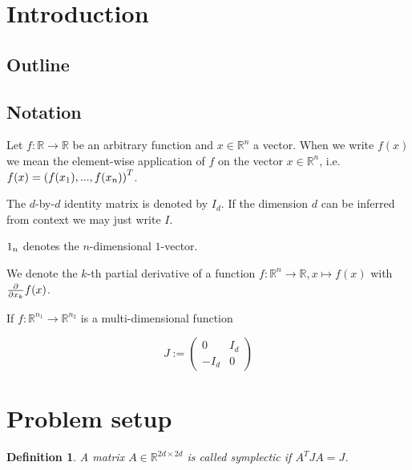 \documentclass[twoside,a4paper]{article}
\newtheorem{definition}{Definition}
\begin{document}
\section{Introduction}

\subsection{Outline}

\subsection{Notation}

Let $f: \mathbb{R} \rightarrow \mathbb{R}$ be an arbitrary function and $x \in \mathbb{R}^n$
a vector. When we write $f(x)$ we mean the element-wise application of $f$ 
on the vector $x \in \mathbb{R}^n$, i.e. $f(x) = \left(
	f(x_1), ..., f(x_n)
\right)^T$.

The $d$-by-$d$ identity matrix is denoted by $I_d$. If the dimension $d$ can be inferred
from context we may just write $I$.

$1_{n}$ denotes the $n$-dimensional $1$-vector.


We denote the $k$-th partial derivative of a function $f: \mathbb{R}^n \to \mathbb{R},
x \mapsto f(x)$ with $\frac{\partial }{\partial x_k} f(x)$.

If $f: \mathbb{R}^{n_1} \to \mathbb{R}^{n_2}$ is a multi-dimensional function




\begin{equation*}
	J := \begin{pmatrix}
		0 & I_d \\
		-I_d & 0
	\end{pmatrix}
\end{equation*}

%
%
\newpage
\section{Problem setup}

\begin{definition}
	A matrix $A \in \mathbb{R}^{2d \times 2d}$ is called symplectic if $A^TJA=J$.
\end{definition}
\end{document}
